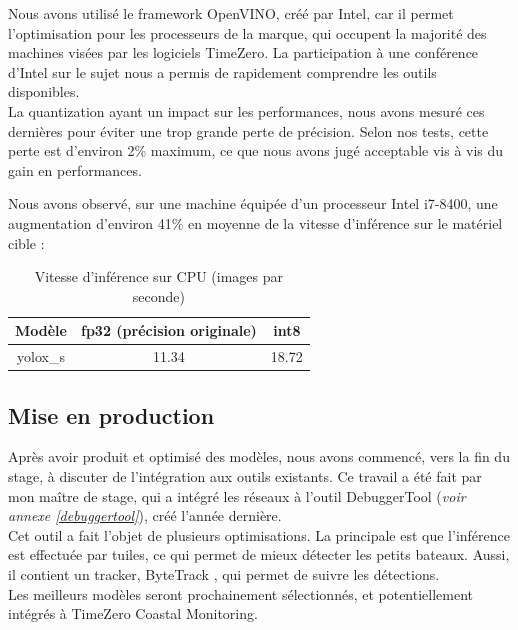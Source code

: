 Nous avons utilisé le framework OpenVINO, créé par Intel, car il permet l'optimisation pour
les processeurs de la marque, qui occupent la majorité des machines visées par les logiciels TimeZero.
La participation à une conférence d'Intel sur le sujet nous a permis de rapidement
comprendre les outils disponibles. \\

La quantization ayant un impact sur les performances, nous avons mesuré ces dernières pour
éviter une trop grande perte de précision. Selon nos tests, cette perte est d'environ 2\% maximum,
ce que nous avons jugé acceptable vis à vis du gain en performances.

Nous avons observé, sur une machine équipée d'un processeur Intel i7-8400, une augmentation d'environ
41\% en moyenne de la vitesse d'inférence sur le matériel cible : \\

\begin{table}[!h]
    \caption{Vitesse d'inférence sur CPU (images par seconde)}
    \begin{center}
    \begin{tabular}{c c c}
        \hline
        Modèle & fp32 (précision originale) & int8 \\
        \hline
        yolox\_s & 11.34 & 18.72 \\
    \end{tabular}
\end{center}
\end{table}

\pagebreak

\subsection{Mise en production}

Après avoir produit et optimisé des modèles, nous avons commencé, vers la fin du stage,
à discuter de l'intégration aux outils existants. Ce travail a été fait par mon maître de stage,
qui a intégré les réseaux à l'outil DebuggerTool (\textit{voir annexe \ref{debuggertool}}),
créé l'année dernière.\\

Cet outil a fait l'objet de plusieurs optimisations. La principale est que l'inférence est effectuée par tuiles,
ce qui permet de mieux détecter les petits bateaux. Aussi, il contient un tracker, ByteTrack \cite{Zhang_Sun_Jiang_Yu_Weng_Yuan_Luo_Liu_Wang_2022},
qui permet de suivre les détections.\\

Les meilleurs modèles seront prochainement sélectionnés,
et potentiellement intégrés à TimeZero Coastal Monitoring.
